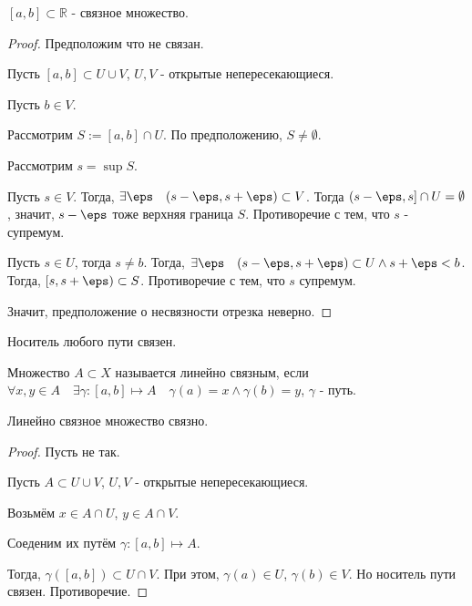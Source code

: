 \begin{theorem} \thmslashn

    $[a, b] \subset \mathbb{R}$ - связное множество.
    \begin{proof} \thmslashn
    
        Предположим что не связан.

        Пусть $[a, b] \subset U \cup V$, $U, V$ - открытые непересекающиеся.

        Пусть $b\in V$. 

        Рассмотрим $S := [a, b]\cap U$. По предположению, $S \neq \emptyset$.

        Рассмотрим $s = \sup S$.

        Пусть $s\in V$. Тогда, $\exists{\eps}\quad (s-\eps, s+\eps) \subset V$. Тогда $(s - \eps, s]\cap U = \emptyset$, значит, $s-\eps$ тоже верхняя граница $S$. Противоречие с тем, что $s$ - супремум.

        Пусть $s\in U$, тогда $s \neq b$. Тогда, $\exists{\eps}\quad (s-\eps, s+\eps) \subset U \land s + \eps < b$. Тогда, $[s, s+\eps) \subset  S$. Противоречие с тем, что $s$ супремум.

        Значит, предположение о несвязности отрезка неверно.
    \end{proof}
\end{theorem}
\begin{consequence} \thmslashn

    Носитель любого пути связен.
\end{consequence}
\begin{definition} \thmslashn 

    Множество $A \subset X$ называется линейно связным, если $\forall{x, y\in A}\quad \exists{\gamma : [a, b] \mapsto A}\quad \gamma(a) = x \land \gamma(b) = y$, $\gamma$ - путь.
\end{definition}
\begin{theorem} \thmslashn

    Линейно связное множество связно.
    \begin{proof} \thmslashn
    
       Пусть не так.

       Пусть $A \subset U \cup V$, $U, V$ - открытые непересекающиеся.

       Возьмём $x\in A\cap U$, $y\in A\cap V$.

       Соеденим их путём $\gamma : [a, b] \mapsto A$.

       Тогда, $\gamma([a, b]) \subset U\cap V$. При этом, $\gamma(a)\in U$, $\gamma(b)\in V$. Но носитель пути связен. Противоречие.
    \end{proof}
\end{theorem}
